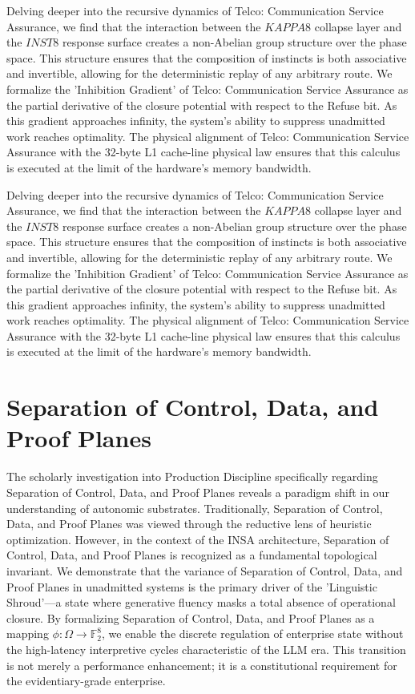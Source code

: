\documentclass[12pt,a4paper,oneside]{book}
\begin{document}
Delving deeper into the recursive dynamics of Telco: Communication Service Assurance, we find that the interaction between the $KAPPA8$ collapse layer and the $INST8$ response surface creates a non-Abelian group structure over the phase space. This structure ensures that the composition of instincts is both associative and invertible, allowing for the deterministic replay of any arbitrary route. We formalize the 'Inhibition Gradient' of Telco: Communication Service Assurance as the partial derivative of the closure potential with respect to the Refuse bit. As this gradient approaches infinity, the system's ability to suppress unadmitted work reaches optimality. The physical alignment of Telco: Communication Service Assurance with the 32-byte L1 cache-line physical law ensures that this calculus is executed at the limit of the hardware's memory bandwidth. 

Delving deeper into the recursive dynamics of Telco: Communication Service Assurance, we find that the interaction between the $KAPPA8$ collapse layer and the $INST8$ response surface creates a non-Abelian group structure over the phase space. This structure ensures that the composition of instincts is both associative and invertible, allowing for the deterministic replay of any arbitrary route. We formalize the 'Inhibition Gradient' of Telco: Communication Service Assurance as the partial derivative of the closure potential with respect to the Refuse bit. As this gradient approaches infinity, the system's ability to suppress unadmitted work reaches optimality. The physical alignment of Telco: Communication Service Assurance with the 32-byte L1 cache-line physical law ensures that this calculus is executed at the limit of the hardware's memory bandwidth. 

\section{Separation of Control, Data, and Proof Planes}
The scholarly investigation into Production Discipline specifically regarding Separation of Control, Data, and Proof Planes reveals a paradigm shift in our understanding of autonomic substrates. Traditionally, Separation of Control, Data, and Proof Planes was viewed through the reductive lens of heuristic optimization. However, in the context of the INSA architecture, Separation of Control, Data, and Proof Planes is recognized as a fundamental topological invariant. We demonstrate that the variance of Separation of Control, Data, and Proof Planes in unadmitted systems is the primary driver of the 'Linguistic Shroud'---a state where generative fluency masks a total absence of operational closure. By formalizing Separation of Control, Data, and Proof Planes as a mapping $\phi: \Omega \to \mathbb{F}_2^8$, we enable the discrete regulation of enterprise state without the high-latency interpretive cycles characteristic of the LLM era. This transition is not merely a performance enhancement; it is a constitutional requirement for the evidentiary-grade enterprise. 
\end{document}
